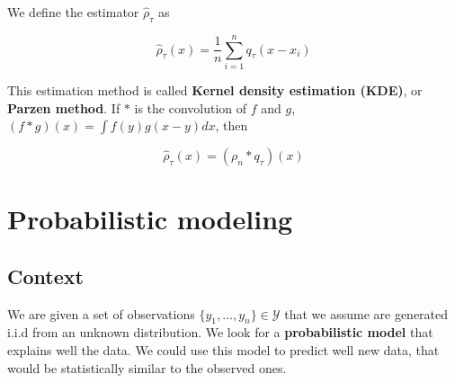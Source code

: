 \documentclass[
10pt, %
a4paper, %
oneside, %
headinclude,footinclude, %
BCOR5mm, %
]{scrartcl}
\begin{document}
We define the estimator $ \hat{\rho}_{\tau}$ as

\begin{equation*}
    \hat{\rho}_{\tau}(x) = \frac{1}{n} \sum^{n}_{i=1} q_{\tau}(x-x_i)
\end{equation*}

This estimation method is called \textbf{{Kernel density estimation (KDE)}}, or \textbf{{Parzen method}}. If $*$ is the convolution of $f$ and $g$, $(f*g)(x)= \int f(y)g(x-y)  dx $, then 

\begin{equation*}
    \hat{\rho}_{\tau}(x) =  (\rho_n * q_{\tau})(x)
\end{equation*}

% 
% 
% 

\section{\large\color{Blue}Probabilistic modeling}

\subsection{\large\color{MidnightBlue}Context}

We are given a set of observations $\{y_1, \dots, y_n\}\in \mathcal{Y} $ that we assume are generated i.i.d from an unknown distribution. We look for a \textbf{{probabilistic model}} that explains well the data. We could use this model to predict well new data, that would be statistically similar to the observed ones.
\end{document}
